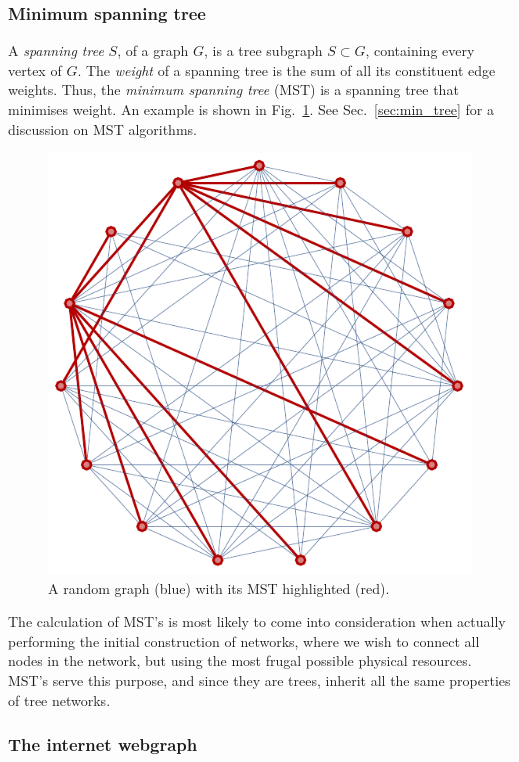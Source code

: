 \documentclass[aps,rmp,twocolumn,amsmath,amssymb,nofootinbib,superscriptaddress]{revtex4}
\begin{document}
%
%

\subsubsection{Minimum spanning tree} \label{sec:graph_MST}

A \emph{spanning tree} $S$, of a graph $G$, is a tree subgraph \mbox{$S\subset G$}, containing every vertex of $G$. The \emph{weight} of a spanning tree is the sum of all its constituent edge weights. Thus, the \emph{minimum spanning tree} (MST) is a spanning tree that minimises weight. An example is shown in Fig.~\ref{fig:mst}. See Sec.~\ref{sec:min_tree} for a discussion on MST algorithms.

\begin{figure}[!htb]
\includegraphics[width=0.8\columnwidth]{mst}
\caption{A random graph (blue) with its MST highlighted (red).} \label{fig:mst}
\end{figure}

The calculation of MST's is most likely to come into consideration when actually performing the initial construction of networks, where we wish to connect all nodes in the network, but using the most frugal possible physical resources. MST's serve this purpose, and since they are trees, inherit all the same properties of tree networks.

%
%

\subsubsection{The internet webgraph}
\end{document}
